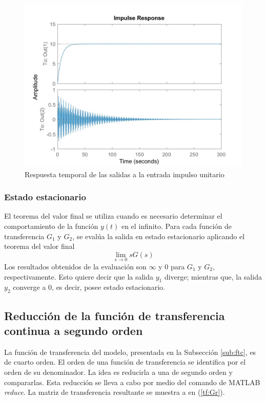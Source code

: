 \documentclass[journal]{IEEEtran}
\begin{document}
\begin{figure}[ht!]
\caption{Respuesta temporal de las salidas a la entrada impulso unitario\label{fig:impulse}}
  \centering
\includegraphics[scale=0.18]{tf/impulse.jpg}
\end{figure}

\subsubsection*{Estado estacionario}
El teorema del valor final se utiliza cuando es necesario determinar el comportamiento de la función $y(t)$ en el infinito. Para cada función de transferencia $G_1$ y $G_2$, se evalúa la salida en estado estacionario aplicando el teorema del valor final
\[
\lim_{s \to 0} sG(s)
\]
Los resultados obtenidos de la evaluación son $\infty$ y 0 para $G_1$ y $G_2$, respectivamente. Esto quiere decir que la salida $y_1$ diverge; mientras que, la salida $y_2$ converge a 0, es decir, posee estado estacionario. 

\subsection{Reducción de la función de transferencia continua a segundo orden}
La función de transferencia del modelo, presentada en la Subsección \ref{sub:ftc}, es de cuarto orden. El orden de una función de transferencia se identifica por el orden de su denominador. La idea es reducirla a una de segundo orden y compararlas. Esta reducción se lleva a cabo por medio del comando de MATLAB \textit{reduce}. La matriz de transferencia resultante se muestra a en (\ref{tf:Gr}).\\ 
\end{document}
